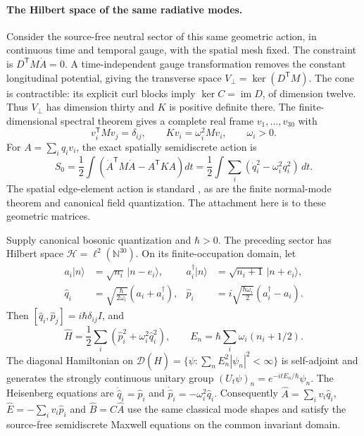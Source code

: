\paragraph{The Hilbert space of the same radiative modes.}
Consider the source-free neutral sector of this same geometric action,
in continuous time and temporal gauge, with the spatial mesh fixed. The constraint is
\(D^{\mathsf T}M\dot A=0\). A time-independent gauge transformation
removes the constant longitudinal potential, giving the transverse space
\(V_\perp=\ker(D^{\mathsf T}M)\). The cone is contractible:
its explicit curl blocks imply \(\ker C=\operatorname{im}D\),
of dimension twelve. Thus \(V_\perp\) has dimension thirty and
\(K\) is positive definite there. The finite-dimensional spectral theorem
gives a complete real frame \(v_1,\ldots,v_{30}\) with
\[
 v_i^{\mathsf T}Mv_j=\delta_{ij},\qquad
 Kv_i=\omega_i^2Mv_i,\qquad \omega_i>0.
\]
For \(A=\sum_i q_i v_i\), the exact spatially semidiscrete action is
\[
 S_0=\frac12\int\left(\dot A^{\mathsf T}M\dot A-A^{\mathsf T}KA\right)dt
    =\frac12\int\sum_i(\dot q_i^2-\omega_i^2q_i^2)\,dt.
\]
The spatial edge-element action is standard \cite{HeTeixeira2005}, as are
the finite normal-mode theorem and canonical field quantization. The
attachment here is to these geometric matrices.

\begin{theorem}
\label{thm:whitney-fock-bridge}
Supply canonical bosonic quantization and \(\hbar>0\). The preceding
sector has Hilbert space \(\mathcal H=\ell^2(\mathbb N^{30})\).
On its finite-occupation domain, let
\begin{align*}
 a_i|n\rangle&=\sqrt{n_i}\,|n-e_i\rangle,&
 a_i^\dagger|n\rangle&=\sqrt{n_i+1}\,|n+e_i\rangle,\\
 \widehat q_i&=\sqrt{\frac{\hbar}{2\omega_i}}(a_i+a_i^\dagger),&
 \widehat p_i&=i\sqrt{\frac{\hbar\omega_i}{2}}(a_i^\dagger-a_i).
\end{align*}
Then \([\widehat q_i,\widehat p_j]=i\hbar\delta_{ij}I\), and
\[
 \widehat H=\frac12\sum_i(\widehat p_i^2+\omega_i^2\widehat q_i^2),
 \qquad E_n=\hbar\sum_i\omega_i(n_i+1/2).
\]
The diagonal Hamiltonian on
\(\mathcal D(\widehat H)=\{\psi:\sum_n E_n^2|\psi_n|^2<\infty\}\)
is self-adjoint and generates the strongly continuous unitary group
\((U_t\psi)_n=e^{-itE_n/\hbar}\psi_n\).
The Heisenberg equations are
\(\dot{\widehat q}_i=\widehat p_i\) and
\(\dot{\widehat p}_i=-\omega_i^2\widehat q_i\).
Consequently \(\widehat A=\sum_i v_i\widehat q_i\),
\(\widehat E=-\sum_i v_i\widehat p_i\) and
\(\widehat B=C\widehat A\) use the same classical mode shapes and
satisfy the source-free semidiscrete Maxwell equations on the common
invariant domain.
\end{theorem}

